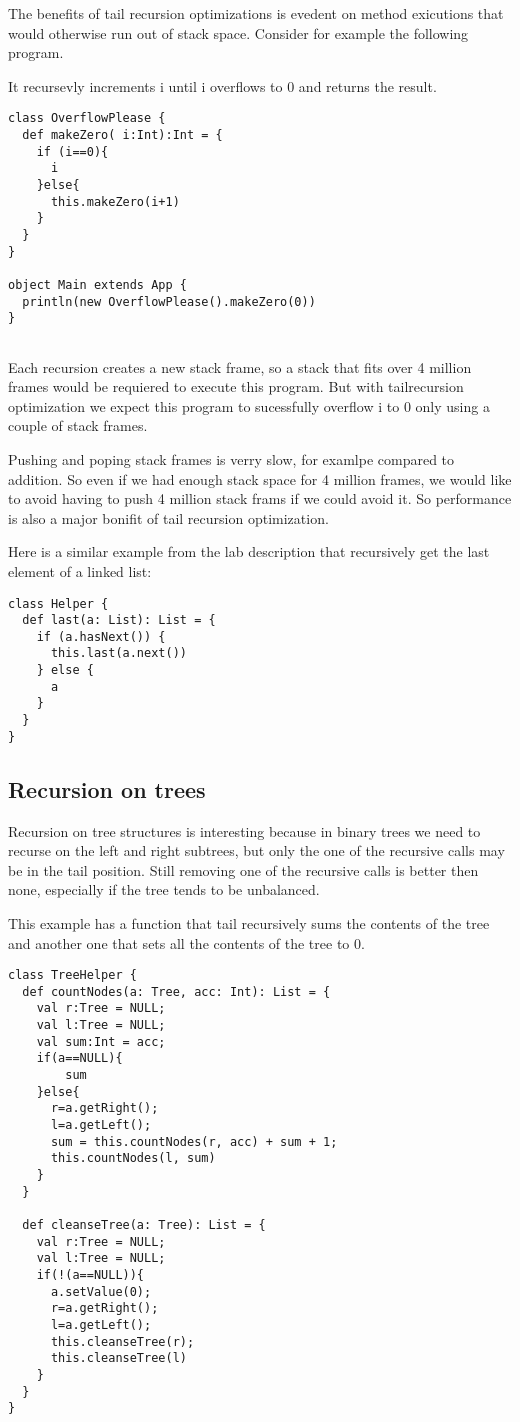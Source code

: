 The benefits of tail recursion optimizations is evedent on  method exicutions that would otherwise run out of stack space. Consider for example the following program.

It recursevly increments i until i overflows to 0 and returns the result.
\begin{lstlisting}
class OverflowPlease {
  def makeZero( i:Int):Int = {
    if (i==0){
      i
    }else{
      this.makeZero(i+1)
    }
  }
}

object Main extends App {
  println(new OverflowPlease().makeZero(0))
}


\end{lstlisting}

Each recursion creates a new stack frame, so a stack that fits over 4 million frames would be requiered to execute this program. But with tailrecursion optimization we expect this program to sucessfully overflow i to 0 only using a couple of stack frames.

Pushing and poping stack frames is verry slow, for examlpe compared to addition. So even if we had enough stack space for 4 million frames, we would like to avoid having to push 4 million stack frams if we could avoid it. So performance is also a major bonifit of tail recursion optimization.


Here is a similar example from the lab description that recursively get the last element of a linked list:

\begin{lstlisting}
class Helper {
  def last(a: List): List = {
    if (a.hasNext()) {
      this.last(a.next())
    } else {
      a
    }
  }
}
\end{lstlisting}

\subsection{Recursion on trees}

Recursion on tree structures is interesting because in binary trees we need to recurse on the left and right subtrees, but only the one of the recursive calls may be in the tail position. Still removing one of the recursive calls is better then none, especially if the tree tends to be unbalanced.

This example has a function that tail recursively sums the contents of the tree and another one that sets all the contents of the tree to 0.

\begin{lstlisting}
class TreeHelper {
  def countNodes(a: Tree, acc: Int): List = {
    val r:Tree = NULL;
    val l:Tree = NULL;
    val sum:Int = acc;
    if(a==NULL){
        sum
    }else{
      r=a.getRight();
      l=a.getLeft();
      sum = this.countNodes(r, acc) + sum + 1;
      this.countNodes(l, sum)
    }
  }
  
  def cleanseTree(a: Tree): List = {
    val r:Tree = NULL;
    val l:Tree = NULL;
    if(!(a==NULL)){
      a.setValue(0);
      r=a.getRight();
      l=a.getLeft();
      this.cleanseTree(r);
      this.cleanseTree(l)
    }
  }
}
\end{lstlisting}

